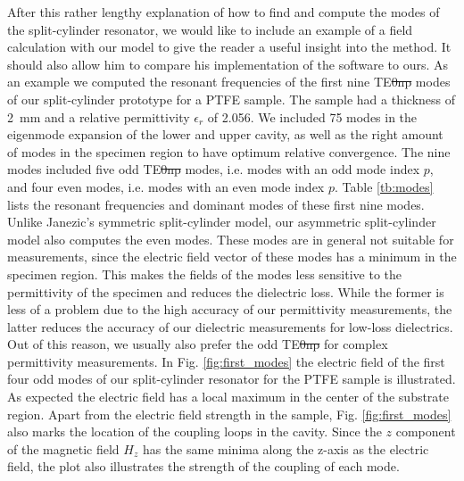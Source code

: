 After this rather lengthy explanation of how to find and compute the modes of the split-cylinder resonator, we would like to include an example of a field calculation with our model to give the reader a useful insight into the method. It should also allow him to compare his implementation of the software to ours. As an example we computed the resonant frequencies of the first nine TE\st{0np} modes of our split-cylinder prototype for a PTFE sample. The sample had a thickness of \SI{2}{\milli\meter} and a relative permittivity $\epsilon_r$ of 2.056. We included 75 modes in the eigenmode expansion of the lower and upper cavity, as well as the right amount of modes in the specimen region to have optimum relative convergence. The nine modes included five odd TE\st{0np} modes, i.e. modes with an odd mode index $p$, and four even modes, i.e. modes with an even mode index $p$. Table \ref{tb:modes} lists the resonant frequencies and dominant modes of these first nine modes. Unlike Janezic's symmetric split-cylinder model, our asymmetric split-cylinder model also computes the even modes. These modes are in general not suitable for measurements, since the electric field vector of these modes has a minimum in the specimen region. This makes the fields of the modes less sensitive to the permittivity of the specimen and reduces the dielectric loss. While the former is less of a problem due to the high accuracy of our permittivity measurements, the latter reduces the accuracy of our dielectric measurements for low-loss dielectrics. Out of this reason, we usually also prefer the odd TE\st{0np} for complex permittivity measurements. In Fig. \ref{fig:first_modes} the electric field of the first four odd modes of our split-cylinder resonator for the PTFE sample is illustrated. As expected the electric field has a local maximum in the center of the substrate region. Apart from the electric field strength in the sample, Fig. \ref{fig:first_modes} also marks the location of the coupling loops in the cavity. Since the $z$ component of the magnetic field $H_z$ has the same minima along the z-axis as the electric field, the plot also illustrates the strength of the coupling of each mode.
